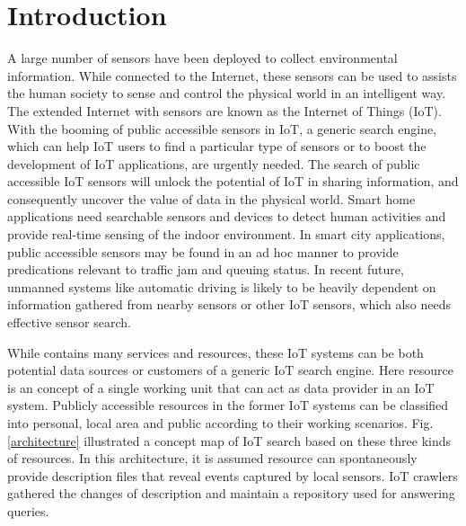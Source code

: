 \documentclass[conference]{IEEEtran}
\begin{document}
\section{Introduction} \label{introduction}
A large number of sensors have been deployed to collect environmental information. While connected to the Internet, these sensors can be used to assists the human society to sense and control the physical world in an intelligent way. The extended Internet with sensors are known as the Internet of Things (IoT). 
With the booming of public accessible sensors in IoT, a generic search engine, which can help IoT users to find a particular type of sensors or to boost the development of IoT applications, are urgently needed. 
The search of public accessible IoT sensors will unlock the potential of IoT in sharing information, and consequently uncover the value of data in the physical world.
Smart home applications need searchable sensors and devices to detect human activities and provide real-time sensing of the indoor environment. 
In smart city applications, public accessible sensors may be found in an ad hoc manner to provide predications relevant to traffic jam and queuing status. 
In recent future, unmanned systems like automatic driving is likely to be heavily dependent on information gathered from nearby sensors or other IoT sensors, which also needs effective sensor search. 

While contains many services and resources, these IoT systems can be both potential data sources or customers of a generic IoT search engine. Here resource is an concept of a single working unit that can act as data provider in an IoT system.
Publicly accessible resources in the former IoT systems can be classified into personal, local area and public according to their working scenarios.
Fig. \ref{architecture} illustrated a concept map of IoT search based on these three kinds of resources.
In this architecture, it is assumed resource can spontaneously provide description files that reveal events captured by local sensors.
IoT crawlers gathered the changes of description and maintain a repository used for answering queries.
\end{document}

